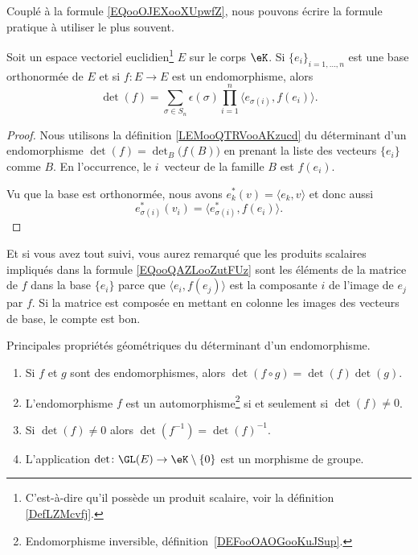 Couplé à la formule \eqref{EQooOJEXooXUpwfZ}, nous pouvons écrire la formule pratique à utiliser le plus souvent. 

\begin{lemma}       \label{LEMooEZFIooXyYybe}
    Soit un espace vectoriel euclidien\footnote{C'est-à-dire qu'il possède un produit scalaire, voir la définition \ref{DefLZMcvfj}.} \( E\) sur le corps \( \eK\). Si \( \{ e_i \}_{i=1,\ldots, n}\) est une base orthonormée de \( E\) et si \( f\colon E\to E\) est un endomorphisme, alors
    \begin{equation}        \label{EQooQAZLooZutFUz}
        \det(f)=\sum_{\sigma\in S_n}\epsilon(\sigma)\prod_{i=1}^n\langle e_{\sigma(i)}, f(e_i)\rangle.
    \end{equation}
\end{lemma}

\begin{proof}
    Nous utilisons la définition \ref{LEMooQTRVooAKzucd} du déterminant d'un endomorphisme \( \det(f)=\det_B\big( f(B) \big)\) en prenant la liste des vecteurs \( \{ e_i \}\) comme \( B\). En l'occurrence, le \( i\)\ieme\ vecteur de la famille \( B\) est \( f(e_i)\).

    Vu que la base est orthonormée, nous avons \( e^*_k(v)=\langle e_k, v\rangle \) et donc aussi
    \begin{equation}
        e^*_{\sigma(i)}(v_i)=\langle e_{\sigma(i)}^*, f(e_i)\rangle.
    \end{equation}
\end{proof}

Et si vous avez tout suivi, vous aurez remarqué que les produits scalaires impliqués dans la formule \eqref{EQooQAZLooZutFUz} sont les éléments de la matrice de \( f\) dans la base \( \{ e_i \}\) parce que \( \langle e_i, f(e_j)\rangle \) est la composante \( i\) de l'image de \( e_j\) par \( f\). Si la matrice est composée en mettant en colonne les images des vecteurs de base, le compte est bon.

\begin{proposition}     \label{PropYQNMooZjlYlA}
    Principales propriétés géométriques du déterminant d'un endomorphisme.
    \begin{enumerate}
        \item   \label{ItemUPLNooYZMRJy}
            Si \( f\) et \( g\)  sont des endomorphismes, alors \( \det(f\circ g)=\det(f)\det(g)\).
        \item       \label{ITEMooNZNLooODdXeH}
            L'endomorphisme \( f\) est un automorphisme\footnote{Endomorphisme inversible, définition~\ref{DEFooOAOGooKuJSup}.} si et seulement si \( \det(f)\neq 0\).
        \item   \label{ITEMooZMVXooLGjvCy}
            Si \( \det(f)\neq 0\) alors \( \det(f^{-1})=\det(f)^{-1}\).
        \item       \label{ItemooPJVYooYSwqaE}
            L'application \( \det\colon \GL(E)\to \eK\setminus\{ 0 \}\) est un morphisme de groupe.
    \end{enumerate}
\end{proposition}

